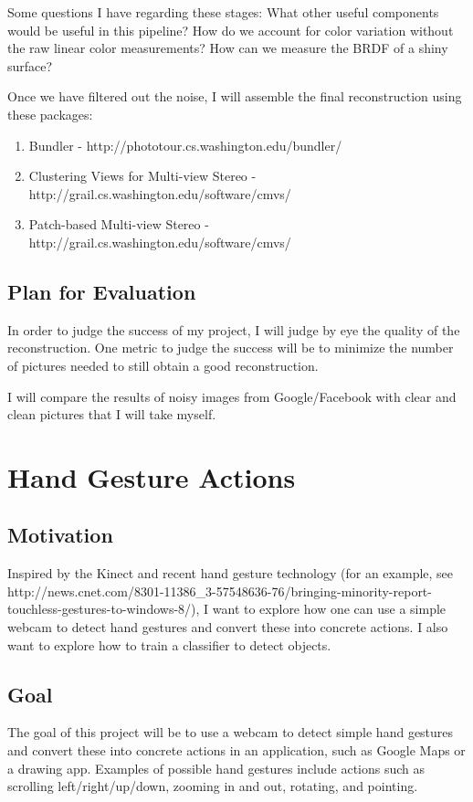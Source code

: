 \documentclass[12pt]{article}
\begin{document}
Some questions I have regarding these stages: What other useful components would be useful in this pipeline? How do we account for color variation without the raw linear color measurements? How can we measure the BRDF of a shiny surface?

Once we have filtered out the noise, I will assemble the final reconstruction using these packages:
\begin{enumerate}
\item Bundler - http://phototour.cs.washington.edu/bundler/
\item Clustering Views for Multi-view Stereo - http://grail.cs.washington.edu/software/cmvs/
\item Patch-based Multi-view Stereo - http://grail.cs.washington.edu/software/cmvs/
\end{enumerate}

\subsection{Plan for Evaluation}
In order to judge the success of my project, I will judge by eye the quality of the reconstruction. One metric to judge the success will be to minimize the number of pictures needed to still obtain a good reconstruction.

I will compare the results of noisy images from Google/Facebook with clear and clean pictures that I will take myself.

\section{Hand Gesture Actions}

\subsection{Motivation}
Inspired by the Kinect and recent hand gesture technology (for an example, see http://news.cnet.com/8301-11386\_3-57548636-76/bringing-minority-report-touchless-gestures-to-windows-8/), I want to explore how one can use a simple webcam to detect hand gestures and convert these into concrete actions. I also want to explore how to train a classifier to detect objects.

\subsection{Goal}
The goal of this project will be to use a webcam to detect simple hand gestures and convert these into concrete actions in an application, such as Google Maps or a drawing app. Examples of possible hand gestures include actions such as scrolling left/right/up/down, zooming in and out, rotating, and pointing. 
\end{document}
